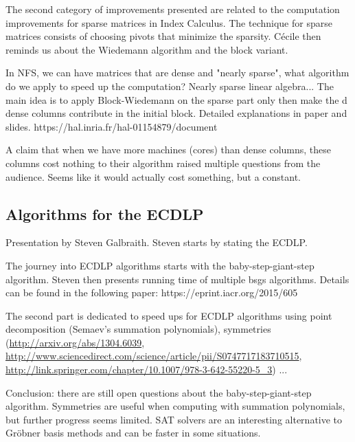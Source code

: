 \documentclass[11pt]{article}
\begin{document}
The second category of improvements presented are related to the computation improvements for sparse matrices in Index Calculus. The technique for sparse matrices consists of choosing pivots that minimize the sparsity. Cécile then reminds us about the Wiedemann algorithm and the block variant.

In NFS, we can have matrices that are dense and "nearly sparse", what algorithm do we apply to speed up the computation? Nearly sparse linear algebra...
The main idea is to apply Block-Wiedemann on the sparse part only then make the d dense columns contribute in the initial block. Detailed explanations in paper and slides. https://hal.inria.fr/hal-01154879/document

A claim that when we have more machines (cores) than dense columns, these columns cost nothing to their algorithm raised multiple questions from the audience. Seems like it would actually cost something, but a constant.

\subsection{Algorithms for the ECDLP}
Presentation by Steven Galbraith. Steven starts by stating the ECDLP.

The journey into ECDLP algorithms starts with the baby-step-giant-step algorithm. Steven then presents running time of multiple bsgs algorithms. Details can be found in the following paper: https://eprint.iacr.org/2015/605

The second part is dedicated to speed ups for ECDLP algorithms using point decomposition (Semaev's summation polynomials), symmetries (\url{http://arxiv.org/abs/1304.6039}, \url{http://www.sciencedirect.com/science/article/pii/S0747717183710515}, \url{http://link.springer.com/chapter/10.1007/978-3-642-55220-5_3}) ...

Conclusion: there are still open questions about the baby-step-giant-step algorithm. Symmetries are useful when computing with summation polynomials, but further progress seems limited. SAT solvers are an interesting alternative to Gröbner basis methods and can be faster in some situations.
\end{document}
